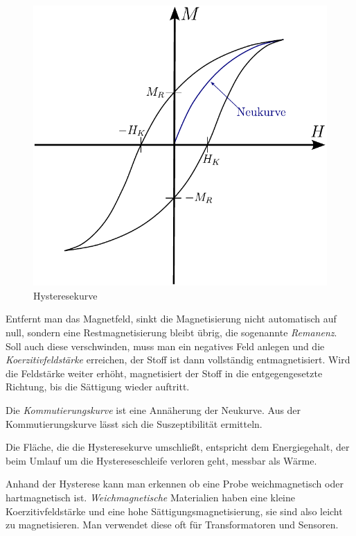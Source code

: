 \documentclass[12pt,a4paper]{scrartcl}
\numberwithin{equation}{section} %
\begin{document}
\begin{figure}[ht]
	\centering
	\includegraphics[scale=0.7]{../media/B2.4/Hysteresekurve.pdf}
	\caption{Hysteresekurve}
	\label{Abb: Hysteresekurve}
\end{figure}

Entfernt man das Magnetfeld, sinkt die Magnetisierung nicht automatisch auf null, sondern eine Restmagnetisierung bleibt übrig, die sogenannte \emph{Remanenz}. Soll auch diese verschwinden, muss man ein negatives Feld anlegen und die \emph{Koerzitivfeldstärke} erreichen, der Stoff ist dann vollständig entmagnetisiert. Wird die Feldstärke weiter erhöht, magnetisiert der Stoff in die entgegengesetzte Richtung, bis die Sättigung wieder auftritt.

Die \emph{Kommutierungskurve} ist eine Annäherung der Neukurve. Aus der Kommutierungskurve lässt sich die Suszeptibilität ermitteln.

Die Fläche, die die Hysteresekurve umschließt, entspricht dem Energiegehalt, der beim Umlauf um die Hystereseschleife verloren geht, messbar als Wärme.

Anhand der Hysterese kann man erkennen ob eine Probe weichmagnetisch oder hartmagnetisch ist. \emph{Weichmagnetische} Materialien haben eine kleine Koerzitivfeldstärke und eine hohe Sättigungsmagnetisierung, sie sind also leicht zu magnetisieren. Man verwendet diese oft für Transformatoren und Sensoren.
\end{document}
